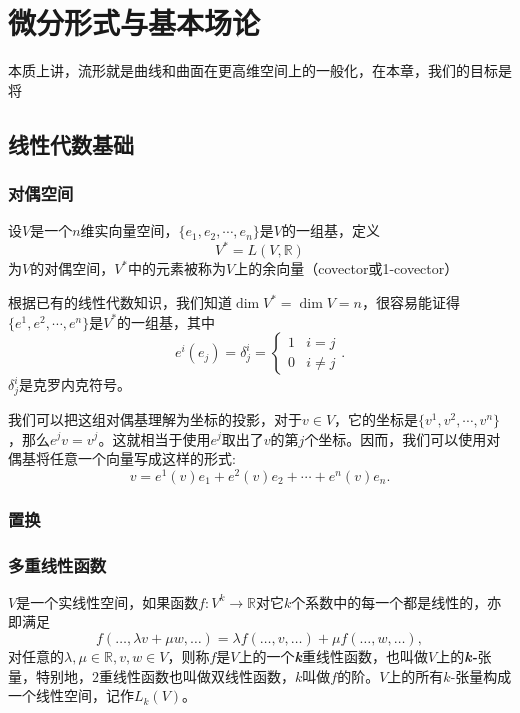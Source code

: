 \chapter{微分形式与基本场论}
    
    本质上讲，流形就是曲线和曲面在更高维空间上的一般化，在本章，我们的目标是将
    
\section{线性代数基础}

    \subsection{对偶空间}
    \begin{definition}[对偶空间]
        设\(V\)是一个\(n\)维实向量空间，\enspace\(\{e_1, e_2, \cdots, e_n\}\)是\(V\)的一组基，定义\[V^*=L(V, \mathbb{R})\]为\(V\)的{\heiti 对偶空间}，\enspace\(V^*\)中的元素被称为\(V\)上的{\heiti 余向量}（covector或1-covector）
    \end{definition}
    根据已有的线性代数知识，我们知道\(\dim V^*=\dim V = n\)，很容易能证得\(\{e^1, e^2, \cdots, e^n\}\)是\(V^*\)的一组基，其中
    \[e^i(e_j) = \delta_{j}^{i}=\begin{cases}1 & i=j\\0 & i\neq j\end{cases}.\]\(\delta_{j}^{i}\)是克罗内克符号。

    我们可以把这组对偶基理解为坐标的投影，对于\(v\in V\)，它的坐标是\(\{v^1, v^2, \cdots, v^n\}\)，那么\(e^j v = v^j\)。这就相当于使用\(e^j\)取出了\(v\)的第\(j\)个坐标。因而，我们可以使用对偶基将任意一个向量写成这样的形式:\[v = e^1(v)e_1+e^2(v)e_2+\cdots+e^n(v)e_n.\]
    \subsection{置换}

    \subsection{多重线性函数}
    \(V\)是一个实线性空间，如果函数\(f:V^k\to\mathbb{R}\)对它\(k\)个系数中的每一个都是线性的，亦即满足\[f(\dots,\lambda v+\mu w,\dots)=\lambda f(\dots,v,\dots)+\mu f(\dots,w,\dots),\]对任意的\(\lambda,\mu\in\mathbb{R},v,w\in V\)，则称\(f\)是\(V\)上的一个\textbf{\textit{k}}{\heiti 重线性函数}，也叫做\(V\)上的\textbf{\textit{k-}}{\heiti 张量}，特别地，\enspace\(2\)重线性函数也叫做双线性函数，\enspace\(k\)叫做\(f\)的阶。\enspace\(V\)上的所有\(k\)-张量构成一个线性空间，记作\(L_k(V)\)。

